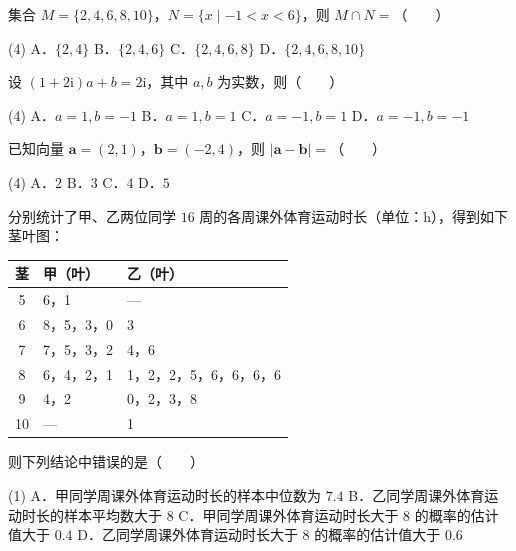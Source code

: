 


\begin{question}
集合 $M=\{2,4,6,8,10\}$，$N=\{x\mid-1<x<6\}$，则 $M\cap N=$\mbox{（　　）}

\begin{gkopts}(4)
\task A．$\{2,4\}$
\task B．$\{2,4,6\}$
\task C．$\{2,4,6,8\}$
\task D．$\{2,4,6,8,10\}$
\end{gkopts}

\end{question}
\begin{question}
设 $(1+2\mathrm i)a+b=2\mathrm i$，其中 $a,b$ 为实数，则\mbox{（　　）}

\begin{gkopts}(4)
\task A．$a=1,b=-1$
\task B．$a=1,b=1$
\task C．$a=-1,b=1$
\task D．$a=-1,b=-1$
\end{gkopts}

\end{question}
\begin{question}
已知向量 $\boldsymbol a=(2,1)$，$\boldsymbol b=(-2,4)$，则 $\lvert\boldsymbol a-\boldsymbol b\rvert=$\mbox{（　　）}

\begin{gkopts}(4)
\task A．$2$
\task B．$3$
\task C．$4$
\task D．$5$
\end{gkopts}

\end{question}
\begin{question}
分别统计了甲、乙两位同学 $16$ 周的各周课外体育运动时长（单位：h），得到如下茎叶图：

\begin{center}
\begin{tabular}{cll}
\toprule
茎 & 甲（叶） & 乙（叶） \\
\midrule
5 & 6，1 & — \\
6 & 8，5，3，0 & 3 \\
7 & 7，5，3，2 & 4，6 \\
8 & 6，4，2，1 & 1，2，2，5，6，6，6，6 \\
9 & 4，2 & 0，2，3，8 \\
10 & — & 1 \\
\bottomrule
\end{tabular}
\end{center}

则下列结论中错误的是\mbox{（　　）}

\begin{gkopts}(1)
\task A．甲同学周课外体育运动时长的样本中位数为 $7.4$
\task B．乙同学周课外体育运动时长的样本平均数大于 $8$
\task C．甲同学周课外体育运动时长大于 $8$ 的概率的估计值大于 $0.4$
\task D．乙同学周课外体育运动时长大于 $8$ 的概率的估计值大于 $0.6$
\end{gkopts}

\end{question}

